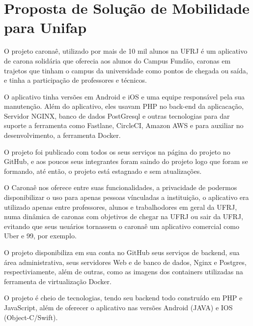 \section{Proposta de Solução de Mobilidade para Unifap}

O projeto caronaê, utilizado por mais de 10 mil alunos na UFRJ é um aplicativo de carona solidária que oferecia aos alunos do Campus Fundão, caronas em trajetos que tinham o campus da universidade como pontos de chegada ou saída, e tinha a participação de professores e técnicos.

O aplicativo tinha versões em Android e iOS e uma equipe responsável pela sua manutenção. %
Além do aplicativo, eles usavam PHP no back-end da aplicacação, Servidor NGINX, banco de dados PostGresql e outras tecnologias para dar suporte a ferramenta como Fastlane, CircleCI, Amazon AWS e para auxiliar no desenvolvimento, a ferramenta Docker.

O projeto foi publicado com todos os seus serviços na página do projeto no GitHub, e aos poucos seus integrantes foram saindo do projeto logo que foram se formando, até então, o projeto está estagnado e sem atualizações.

O Caronaê nos oferece entre suas funcionalidades, a privacidade de podermos disponibilizar o uso para apenas pessoas vínculadas a instituição, o aplicativo era utilizado apenas entre professores, alunos e trabalhodores em geral da UFRJ, numa dinâmica de caronas com objetivos de chegar na UFRJ ou sair da UFRJ, evitando que seus usuários tornassem o caronaê um aplicativo comercial como Uber e 99, por exemplo.

O projeto disponibiliza em sua conta no GitHub seus serviços de backend, sua área administrativa, seus servidores Web e de banco de dados, Nginx e Postgres, respectiviamente, além de outras, como as imagens dos containers utilizadas na ferramenta de virtualização Docker.

O projeto é cheio de tecnologias, tendo seu backend todo construído em PHP e JavaScript, além de oferecer o aplicativo nas versões Android (JAVA) e IOS (Object-C/Swift).

